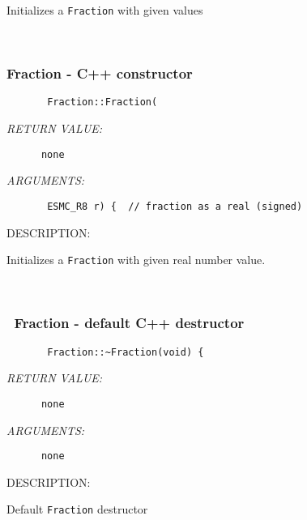         Initializes a {\tt Fraction} with given values
   
 
\mbox{}\hrulefill\ 
 
\subsubsection [Fraction] {Fraction - C++ constructor}


  
\begin{verbatim}       Fraction::Fraction(\end{verbatim}{\em RETURN VALUE:}
\begin{verbatim}      none\end{verbatim}{\em ARGUMENTS:}
\begin{verbatim}       ESMC_R8 r) {  // fraction as a real (signed)
 \end{verbatim}
{\sf DESCRIPTION:\\ }


        Initializes a {\tt Fraction} with given real number value.
   
 
\mbox{}\hrulefill\ 
 
\subsubsection [~Fraction] {~Fraction - default C++ destructor}


  
\begin{verbatim}       Fraction::~Fraction(void) {\end{verbatim}{\em RETURN VALUE:}
\begin{verbatim}      none\end{verbatim}{\em ARGUMENTS:}
\begin{verbatim}      none\end{verbatim}
{\sf DESCRIPTION:\\ }


        Default {\tt Fraction} destructor
  
\setlength{\parskip}{\oldparskip}
\setlength{\parindent}{\oldparindent}
\setlength{\baselineskip}{\oldbaselineskip}
